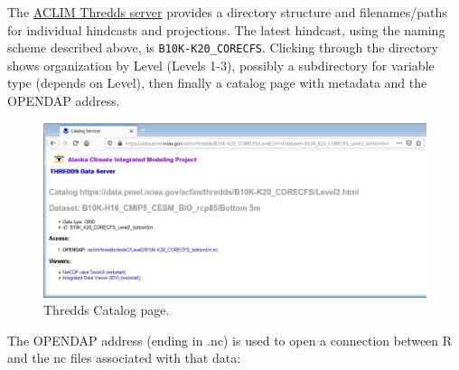 \documentclass[
]{article}
\begin{document}
The \href{https://data.pmel.noaa.gov/aclim/thredds/}{ACLIM Thredds
server} provides a directory structure and filenames/paths for
individual hindcasts and projections. The latest hindcast, using the
naming scheme described above, is \texttt{B10K-K20\_CORECFS}. Clicking
through the directory shows organization by Level (Levels 1-3), possibly
a subdirectory for variable type (depends on Level), then finally a
catalog page with metadata and the OPENDAP address.

\begin{figure}
\centering
\includegraphics[width=1\textwidth,height=\textheight]{Figs/catalog.jpg}
\caption{Thredds Catalog page.}
\end{figure}

The OPENDAP address (ending in .nc) is used to open a connection between
R and the nc files associated with that data:
\end{document}
